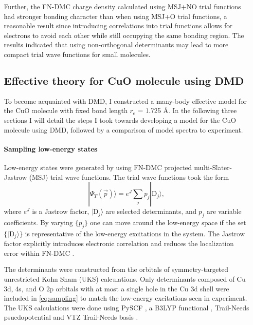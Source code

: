 \documentclass[12pt]{article}
\begin{document}
Further, the FN-DMC charge density calculated using MSJ+NO trial functions had stronger bonding character than when using MSJ+O trial functions, a reasonable result since introducing correlations into trial functions allows for electrons to avoid each other while still occupying the same bonding region. 
The results indicated that using non-orthogonal determinants may lead to more compact trial wave functions for small molecules.

\subsection{Effective theory for CuO molecule using DMD}
To become acquainted with DMD, I constructed a many-body effective model for the CuO molecule with fixed bond length $r_e$ = 1.725 \r{A}.
In the following three sections I will detail the steps I took towards developing a model for the CuO molecule using DMD, followed by a comparison of model spectra to experiment.

\vspace{-10pt}
\paragraph{Sampling low-energy states}
Low-energy states were generated by using FN-DMC projected multi-Slater-Jastrow (MSJ) trial wave functions.
The trial wave functions took the form
\begin{equation}
|\Psi_T(\vec{p}) \rangle =  e^{J}\sum_{j} p_j|\text{D}_j\rangle,
\label{eq:sampling}
\end{equation}
where $e^J$ is a Jastrow factor, $|\text{D}_j\rangle$ are selected determinants, and $p_j$ are variable coefficients.
By varying $\{p_j\}$ one can move around the low-energy space if the set $\{|\text{D}_j \rangle\}$ is representative of the low-energy excitations in the system.
The Jastrow factor explicitly introduces electronic correlation and reduces the localization error within FN-DMC \cite{Foulkes2001}.

The determinants were constructed from the orbitals of symmetry-targeted unrestricted Kohn Sham (UKS) calculations.
Only determinants composed of Cu 3d, 4s, and O 2p orbitals with at most a single hole in the Cu 3d shell were included in \eqref{eq:sampling} to match the low-energy excitations seen in experiment.
The UKS calculations were done using PySCF \cite{Sun2018}, a B3LYP functional \cite{doi:10.1063/1.464304}, Trail-Needs psuedopotential and VTZ Trail-Needs basis \cite{doi:10.1063/1.4811651}.
\end{document}

